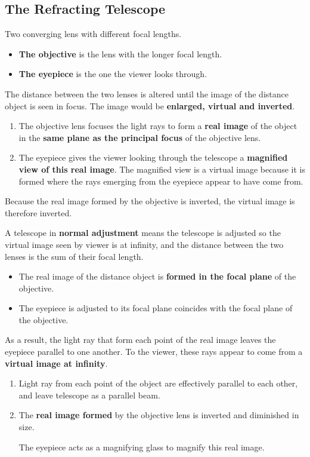 \subsection{The Refracting Telescope}

Two converging lens with different focal lengths.
\begin{itemize}
    \item \textbf{The objective} is the lens with the longer focal length.
    \item \textbf{The eyepiece} is the one the viewer looks through.
\end{itemize}

The distance between the two lenses is altered until the image of the distance object is seen in focus. The image would be \textbf{enlarged, virtual and inverted}.

\begin{enumerate}
    \item The objective lens focuses the light rays to form a \textbf{real image} of the object in the \textbf{same plane as the principal focus} of the objective lens.
    \item The eyepiece gives the viewer looking through the telescope a \textbf{magnified view of this real image}. The magnified view is a virtual image because it is formed where the rays emerging from the eyepiece appear to have come from.
\end{enumerate}

Because the real image formed by the objective is inverted, the virtual image is therefore inverted.

A telescope in \textbf{normal adjustment} means the telescope is adjusted so the virtual image seen by viewer is at infinity, and the distance between the two lenses is the sum of their focal length.
\begin{itemize}
    \item The real image of the distance object is \textbf{formed in the focal plane} of the objective.
    \item The eyepiece is adjusted to its focal plane coincides with the focal plane of the objective.
\end{itemize}

As a result, the light ray that form each point of the real image leaves the eyepiece parallel to one another. To the viewer, these rays appear to come from a \textbf{virtual image at infinity}.

\begin{enumerate}
    \item Light ray from each point of the object are effectively parallel to each other, and leave telescope as a parallel beam.
    \item The \textbf{real image formed} by the objective lens is inverted and diminished in size.

        The eyepiece acts as a magnifying glass to magnify this real image.
\end{enumerate}

